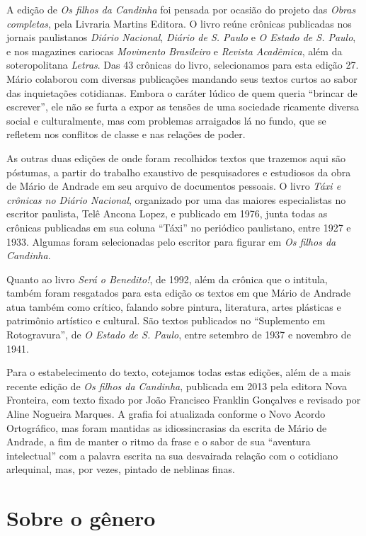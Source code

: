 A edição de \emph{Os filhos da Candinha} foi pensada por ocasião do
projeto das \emph{Obras completas}, pela Livraria Martins Editora. O
livro reúne crônicas publicadas nos jornais paulistanos \emph{Diário
Nacional}, \emph{Diário de S. Paulo} e \emph{O Estado de S. Paulo}, e
nos magazines cariocas \emph{Movimento Brasileiro} e \emph{Revista
Acadêmica}, além da soteropolitana \emph{Letras}. Das 43 crônicas do
livro, selecionamos para esta edição 27. Mário colaborou com diversas
publicações mandando seus textos curtos ao sabor das inquietações
cotidianas. Embora o caráter lúdico de quem queria ``brincar de
escrever'', ele não se furta a expor as tensões de uma sociedade
ricamente diversa social e culturalmente, mas com problemas arraigados
lá no fundo, que se refletem nos conflitos de classe e nas relações de
poder.

As outras duas edições de onde foram recolhidos textos que trazemos aqui
são póstumas, a partir do trabalho exaustivo de pesquisadores e
estudiosos da obra de Mário de Andrade em seu arquivo de documentos
pessoais. O livro \emph{Táxi e crônicas no Diário Nacional}, organizado
por uma das maiores especialistas no escritor paulista, Telê Ancona
Lopez, e publicado em 1976, junta todas as crônicas publicadas em sua
coluna ``Táxi'' no periódico paulistano, entre 1927 e 1933. Algumas
foram selecionadas pelo escritor para figurar em \emph{Os filhos da
Candinha}.

Quanto ao livro \emph{Será o Benedito!}, de 1992, além da crônica que o
intitula, também foram resgatados para esta edição os textos em que
Mário de Andrade atua também como crítico, falando sobre pintura,
literatura, artes plásticas e patrimônio artístico e cultural. São
textos publicados no ``Suplemento em Rotogravura'', de \emph{O Estado de
S. Paulo}, entre setembro de 1937 e novembro de 1941.

Para o estabelecimento do texto, cotejamos todas estas edições, além de
a mais recente edição de \emph{Os filhos da Candinha}, publicada em 2013
pela editora Nova Fronteira, com texto fixado por João Francisco
Franklin Gonçalves e revisado por Aline Nogueira Marques. A grafia foi
atualizada conforme o Novo Acordo Ortográfico, mas foram mantidas as
idiossincrasias da escrita de Mário de Andrade, a fim de manter o ritmo
da frase e o sabor de sua ``aventura intelectual'' com a palavra escrita
na sua desvairada relação com o cotidiano arlequinal, mas, por vezes,
pintado de neblinas finas.

\section{Sobre o gênero}